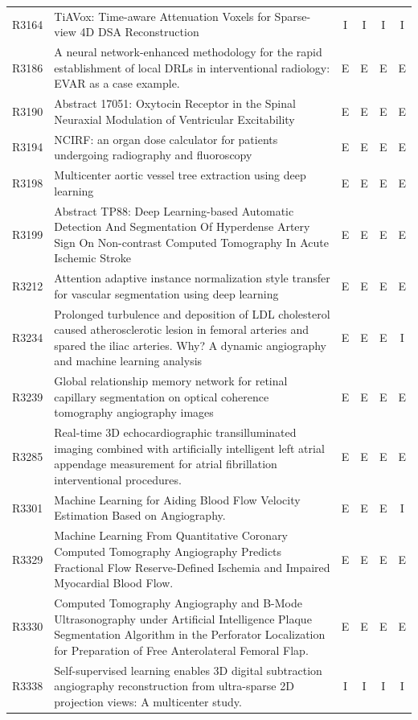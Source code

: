 \begin{longtable}{@{}l p{8.6cm} c c c c@{}}
R3164 & TiAVox: Time-aware Attenuation Voxels for Sparse-view 4D DSA Reconstruction & I & I & I & I \\
R3186 & A neural network-enhanced methodology for the rapid establishment of local DRLs in interventional radiology: EVAR as a case example. & E & E & E & E \\
R3190 & Abstract 17051: Oxytocin Receptor in the Spinal Neuraxial Modulation of Ventricular Excitability & E & E & E & E \\
R3194 & NCIRF: an organ dose calculator for patients undergoing radiography and fluoroscopy & E & E & E & E \\
R3198 & Multicenter aortic vessel tree extraction using deep learning & E & E & E & E \\
R3199 & Abstract TP88: Deep Learning-based Automatic Detection And Segmentation Of Hyperdense Artery Sign On Non-contrast Computed Tomography In Acute Ischemic Stroke & E & E & E & E \\
R3212 & Attention adaptive instance normalization style transfer for vascular segmentation using deep learning & E & E & E & E \\
R3234 & Prolonged turbulence and deposition of LDL cholesterol caused atherosclerotic lesion in femoral arteries and spared the iliac arteries. Why? A dynamic angiography and machine learning analysis & E & E & E & I \\
R3239 & Global relationship memory network for retinal capillary segmentation on optical coherence tomography angiography images & E & E & E & E \\
R3285 & Real-time 3D echocardiographic transilluminated imaging combined with artificially intelligent left atrial appendage measurement for atrial fibrillation interventional procedures. & E & E & E & E \\
R3301 & Machine Learning for Aiding Blood Flow Velocity Estimation Based on Angiography. & E & E & E & I \\
R3329 & Machine Learning From Quantitative Coronary Computed Tomography Angiography Predicts Fractional Flow Reserve-Defined Ischemia and Impaired Myocardial Blood Flow. & E & E & E & E \\
R3330 & Computed Tomography Angiography and B-Mode Ultrasonography under Artificial Intelligence Plaque Segmentation Algorithm in the Perforator Localization for Preparation of Free Anterolateral Femoral Flap. & E & E & E & E \\
R3338 & Self-supervised learning enables 3D digital subtraction angiography reconstruction from ultra-sparse 2D projection views: A multicenter study. & I & I & I & I \\

\end{longtable}
